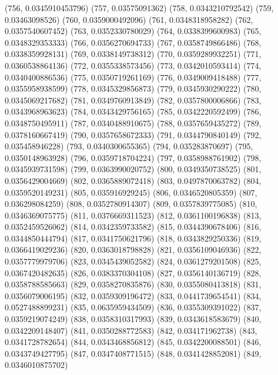 {					(756, 0.0345910453796)
					(757, 0.03575091362)
					(758, 0.0343210792542)
					(759, 0.03463098526)
					(760, 0.0359000492096)
					(761, 0.0348318958282)
					(762, 0.0357540607452)
					(763, 0.0352330780029)
					(764, 0.0338399600983)
					(765, 0.0348329353333)
					(766, 0.0356270694733)
					(767, 0.0358749866486)
					(768, 0.0338359928131)
					(769, 0.0338149738312)
					(770, 0.0359289932251)
					(771, 0.0360538864136)
					(772, 0.0355338573456)
					(773, 0.0342010593414)
					(774, 0.0340400886536)
					(775, 0.0350719261169)
					(776, 0.0349009418488)
					(777, 0.0355958938599)
					(778, 0.0345329856873)
					(779, 0.0345930290222)
					(780, 0.0345069217682)
					(781, 0.0349760913849)
					(782, 0.0357800006866)
					(783, 0.0343968963623)
					(784, 0.0343429756165)
					(785, 0.0342220592499)
					(786, 0.0348750495911)
					(787, 0.0340488910675)
					(788, 0.0357659435272)
					(789, 0.0378160667419)
					(790, 0.0357658672333)
					(791, 0.0344790840149)
					(792, 0.035458946228)
					(793, 0.0340300655365)
					(794, 0.035283870697)
					(795, 0.0350148963928)
					(796, 0.0359718704224)
					(797, 0.0358988761902)
					(798, 0.0345939731598)
					(799, 0.0363990020752)
					(800, 0.0349350738525)
					(801, 0.0356429004669)
					(802, 0.0365889072418)
					(803, 0.0497870063782)
					(804, 0.0359520149231)
					(805, 0.035916929245)
					(806, 0.0346520805359)
					(807, 0.036298084259)
					(808, 0.0352780914307)
					(809, 0.0357839775085)
					(810, 0.0346369075775)
					(811, 0.0376669311523)
					(812, 0.0361100196838)
					(813, 0.0352459526062)
					(814, 0.0342359733582)
					(815, 0.0344390678406)
					(816, 0.0344850444794)
					(817, 0.0341750621796)
					(818, 0.0343829250336)
					(819, 0.0366419029236)
					(820, 0.0363018798828)
					(821, 0.0356109046936)
					(822, 0.0357779979706)
					(823, 0.0345439052582)
					(824, 0.0361279201508)
					(825, 0.0367420482635)
					(826, 0.0383370304108)
					(827, 0.0356140136719)
					(828, 0.0358788585663)
					(829, 0.0358270835876)
					(830, 0.0355080413818)
					(831, 0.0356079006195)
					(832, 0.0359309196472)
					(833, 0.0441739654541)
					(834, 0.0527488899231)
					(835, 0.0635959434509)
					(836, 0.0355309391022)
					(837, 0.0359219074249)
					(838, 0.0358310317993)
					(839, 0.0343618583679)
					(840, 0.0342209148407)
					(841, 0.0350288772583)
					(842, 0.034171962738)
					(843, 0.0341728782654)
					(844, 0.0343468856812)
					(845, 0.0342200088501)
					(846, 0.0343749427795)
					(847, 0.0347408771515)
					(848, 0.0341428852081)
					(849, 0.0346010875702)
}
